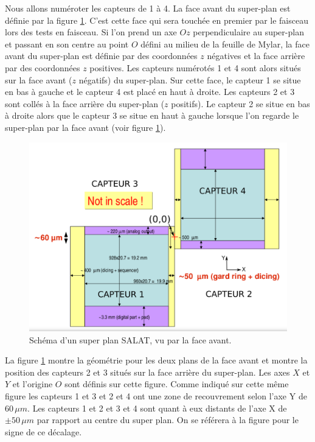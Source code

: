    \medskip
  
  Nous allons num\'eroter les capteurs de 1 \`a 4. La face avant du super-plan est d\'efinie par la figure \ref{fig:coordCapteurSALAT00}. C'est cette face qui sera touch\'ee en premier par le faisceau lors des tests en faisceau. Si l'on prend un axe $Oz$ perpendiculaire au super-plan et passant en son centre au point $O$ d\'efini au milieu de la feuille de Mylar, la face avant du super-plan est d\'efinie par des coordonn\'ees $z$ n\'egatives et la face arri\`ere par des coordonn\'ees $z$ positives. Les capteurs num\'erot\'es 1 et 4 sont alors situ\'es sur la face avant ($z$ n\'egatifs) du super-plan. Sur cette face, le capteur 1 se situe en bas \`a gauche et le capteur 4 est plac\'e en haut \`a droite. Les capteurs 2 et 3 sont coll\'es \`a la face arri\`ere du super-plan ($z$ positifs). Le capteur 2 se situe en bas \`a droite alors que le capteur 3 se situe en haut \`a gauche lorsque l'on regarde le super-plan par la face avant (voir figure \ref{fig:coordCapteurSALAT00}).
    
   \begin{figure}[!htb]
    \begin{center} 
      \includegraphics[scale=0.20]{./figures/SALAT_schema.png}
      \caption{Schéma d'un super plan SALAT, vu par la face avant.}
      \label{fig:coordCapteurSALAT00}
   \end{center}
   \end{figure} 
    
  \medskip
    
    La figure \ref{fig:coordCapteurSALAT00} montre la g\'eom\'etrie pour les deux plans de la face avant et montre la position des capteurs 2 et 3 situ\'es sur la face arri\`ere du super-plan. Les axes $X$ et $Y$ et l'origine $O$ sont d\'efinis sur cette figure. Comme indiqu\'e sur cette m\^eme figure les capteurs 1 et 3 et 2 et 4 ont une zone de recouvrement selon l'axe Y de $60 \, \mu m$. Les capteurs 1 et 2 et 3 et 4 sont quant \`a eux distants de l'axe X de $\pm 50 \, \mu m$ par rapport au centre du super plan. On se r\'ef\'erera \`a la figure pour le signe de ce d\'ecalage.
    

